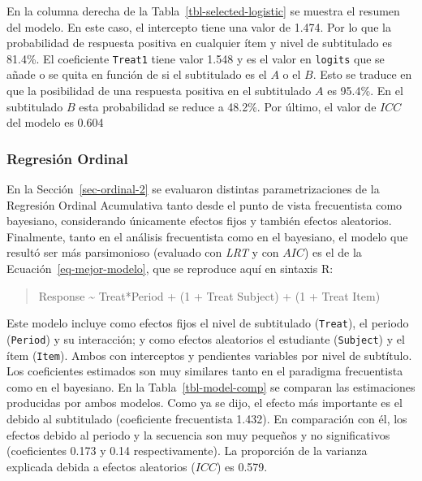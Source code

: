 \documentclass[
  12pt,
  a4paper,
  extrafontsizes,
  onecolumn,
  openright,
  table]{memoir}
\begin{document}
\normalsize

En la columna derecha de la Tabla~\ref{tbl-selected-logistic} se muestra
el resumen del modelo. En este caso, el intercepto tiene una valor de
1.474. Por lo que la probabilidad de respuesta positiva en cualquier
ítem y nivel de subtitulado es 81.4\%. El coeficiente \texttt{Treat1}
tiene valor 1.548 y es el valor en \texttt{logits} que se añade o se
quita en función de si el subtitulado es el \(A\) o el \(B\). Esto se
traduce en que la posibilidad de una respuesta positiva en el
subtitulado \(A\) es 95.4\%. En el subtitulado \(B\) esta probabilidad
se reduce a 48.2\%. Por último, el valor de \(ICC\) del modelo es 0.604

\hypertarget{sec-ordinal-3}{%
\subsubsection{Regresión Ordinal}\label{sec-ordinal-3}}

En la Sección~\ref{sec-ordinal-2} se evaluaron distintas
parametrizaciones de la Regresión Ordinal Acumulativa tanto desde el
punto de vista frecuentista como bayesiano, considerando únicamente
efectos fijos y también efectos aleatorios. Finalmente, tanto en el
análisis frecuentista como en el bayesiano, el modelo que resultó ser
más parsimonioso (evaluado con \emph{\gls{LRT}} y con \(AIC\)) es el de
la Ecuación~\ref{eq-mejor-modelo}, que se reproduce aquí en sintaxis R:

\small

\begin{quote}
Response \textasciitilde{} Treat*Period + (1 + Treat \textbar{} Subject)
+ (1 + Treat \textbar{} Item)
\end{quote}

\normalsize

Este modelo incluye como efectos fijos el nivel de subtitulado
(\texttt{Treat}), el periodo (\texttt{Period}) y su interacción; y como
efectos aleatorios el estudiante (\texttt{Subject}) y el ítem
(\texttt{Item}). Ambos con interceptos y pendientes variables por nivel
de subtítulo. Los coeficientes estimados son muy similares tanto en el
paradigma frecuentista como en el bayesiano. En la
Tabla~\ref{tbl-model-comp} se comparan las estimaciones producidas por
ambos modelos. Como ya se dijo, el efecto más importante es el debido al
subtitulado (coeficiente frecuentista 1.432). En comparación con él, los
efectos debido al periodo y la secuencia son muy pequeños y no
significativos (coeficientes 0.173 y 0.14 respectivamente). La
proporción de la varianza explicada debida a efectos aleatorios
(\(ICC\)) es 0.579.
\end{document}
